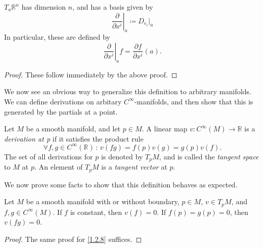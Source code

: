 \begin{corollary}\label{1.2.10}
	$T_a\mathbb{R} ^n$ has dimension $n$, and has a basis given by
	\[
		\left.\frac{\partial }{\partial x^i}\right|_a \coloneqq D_{e_i} |_a
	\]
	In particular, these are defined by
	\[
		\left.\frac{\partial }{\partial x^i} \right|_af=\frac{\partial f}{\partial x^i} (a)
	.\]
\end{corollary}
\begin{proof}
	These follow immediately by the above proof.
\end{proof}

We now see an obvious way to generalize this definition to arbitrary manifolds. We can define derivations on arbitary $C^\infty $-manifolds, and then show that this is generated by the partials at a point.

\begin{definition}\label{1.2.11}
	Let $M$ be a smooth manifold, and let $p\in M$. A linear map $v : C^\infty (M) \to \mathbb{R} $ is a \emph{derivation at p} if it satisfies the product rule
	\[
		\forall f,g\in C^\infty (\mathbb{R} ) \, : \, v(fg)=f(p)v(g)=g(p)v(f)
	.\]
	The set of all derivations for $p$ is denoted by $T_pM$, and is called the \emph{tangent space} to $M$ at $p$. An element of $T_pM$ is a \emph{tangent vector} at $p$.
\end{definition}

We now prove some facts to show that this definition behaves as expected.

\begin{lemma}\label{1.2.12}
	Let $M$ be a smooth manifold with or without boundary, $p\in M$, $v\in T_pM$, and $f,g\in C^\infty (M)$. If $f$ is constant, then $v(f)=0$. If $f(p)=g(p)=0$, then $v(fg)=0$.
\end{lemma}
\begin{proof}
	The same proof for \cref{1.2.8} suffices.
\end{proof}

